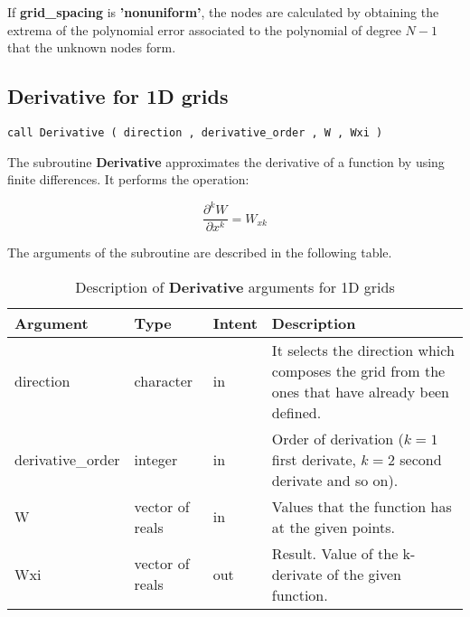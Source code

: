 If \textbf{grid\_spacing} is \textbf{'nonuniform'}, the nodes are calculated by obtaining the extrema of the polynomial error associated to the polynomial of degree $N-1$ that the unknown nodes form.

\subsection*{Derivative for 1D grids}

\lstset{language=Fortran}
\begin{lstlisting}[frame=trBL]
call Derivative ( direction , derivative_order , W , Wxi )
\end{lstlisting}

The subroutine \textbf{Derivative} approximates the derivative of a function by using finite differences. It performs the operation:

\begin{equation*}
\frac{\partial^k W}{\partial x^k}= W_{xk}
\end{equation*}

The arguments of the subroutine are described in the following table.

\begin{table}[H]
	\begin{center}
		\begin{spacing}{1.2}
			\begin{tabular}{| l | l | l | p{6cm} |}
				
				\hline
				
				\bf Argument & \bf Type & \bf Intent & \bf Description \\ \hline \hline
				
				direction & character & in &  It selects the direction which composes the grid from the ones that have already been defined.  \\ \hline
				
				derivative\_order &  integer & in & Order of derivation ($k=1$ first derivate, $k=2$ second derivate and so on).\\ \hline
				
				W &  vector of reals & in & Values that the function has at the given points.\\ \hline
				
				Wxi & vector of reals & out & Result. Value of the k-derivate of the given function.\\ \hline
				
			\end{tabular}
		\end{spacing}
	\end{center}
	\caption{Description of \textbf{Derivative} arguments for 1D grids}
\end{table}

